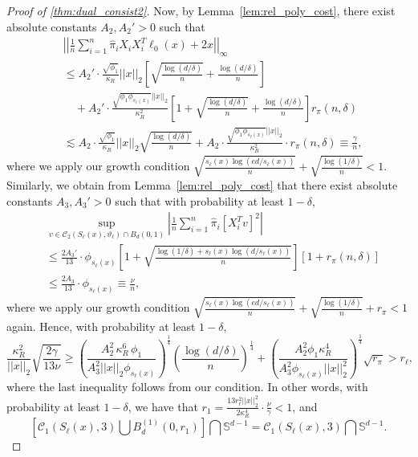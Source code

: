 \documentclass[10pt,a4paper]{amsart}
\theoremstyle{plain}
\theoremstyle{remark}
\renewcommand{\hat}{\widehat}
\newcommand{\norm}[1]{\left|\left| #1 \right|\right|}
\begin{document}
\begin{proof}[Proof of \autoref{thm:dual_consist2}]
	Now, by Lemma~\ref{lem:rel_poly_cost}, there exist absolute constants $A_2,A_2'>0$ such that 
	\begin{align*}
		&\norm{\frac{1}{n}\sum_{i=1}^n \hat{\pi}_i X_i X_i^T \ell_0(x) + 2x}_{\infty} \\
		&\leq A_2'\cdot \frac{\sqrt{\phi_1}}{\kappa_R}\norm{x}_2 \left[\sqrt{\frac{\log(d/\delta)}{n}} + \frac{\log(d/\delta)}{n} \right]\\
		&\quad + A_2'\cdot \frac{\sqrt{\phi_1 \phi_{s_{\ell}(x)}}\norm{x}_2}{\kappa_R^2} \left[1 + \sqrt{\frac{\log(d/\delta)}{n}} + \frac{\log(d/\delta)}{n}\right] r_{\pi}(n,\delta)\\
		&\lesssim A_2\cdot \frac{\sqrt{\phi_1}}{\kappa_R}\norm{x}_2\sqrt{\frac{\log(d/\delta)}{n}} + A_2\cdot \frac{\sqrt{\phi_1 \phi_{s_{\ell}(x)}}\norm{x}_2}{\kappa_R^2} \cdot r_{\pi}(n,\delta) \equiv \frac{\gamma}{n},
	\end{align*}
	where we apply our growth condition $\sqrt{\frac{s_{\ell}(x)\log(ed/s_{\ell}(x))}{n}} + \sqrt{\frac{\log(1/\delta)}{n}} < 1$. Similarly, we obtain from Lemma~\ref{lem:rel_poly_cost} that there exist absolute constants $A_3,A_3'>0$ such that with probability at least $1-\delta$,
	\begin{align*}
		&\sup_{v\in \mathcal{C}_2\left(S_{\ell}(x), \vartheta_{\ell}\right)\cap B_d(0,1)} \left|\frac{1}{n} \sum_{i=1}^n \hat{\pi}_i\left[X_i^Tv\right]^2 \right| \\
		&\leq \frac{2A_3'}{13}\cdot \phi_{s_{\ell}(x)}\left[1+ \sqrt{\frac{\log(1/\delta) + s_{\ell}(x) \log\left(d/s_{\ell}(x)\right)}{n}}\right] \left[1 + r_{\pi}(n,\delta)\right] \\
		&\leq \frac{2A_3}{13}\cdot \phi_{s_{\ell}(x)} \equiv \frac{\nu}{n},
	\end{align*}
	where we apply our growth condition $\sqrt{\frac{s_{\ell}(x)\log(ed/s_{\ell}(x))}{n}} + \sqrt{\frac{\log(1/\delta)}{n}} + r_{\pi} < 1$ again. Hence, with probability at least $1-\delta$,
	$$\frac{\kappa_R^2}{\norm{x}_2} \sqrt{\frac{2\gamma}{13\nu}} \geq \left(\frac{A_2^2 \,\kappa_R^6\, \phi_1}{A_3^2\norm{x}_2 \phi_{s_{\ell}(x)}}\right)^{\frac{1}{4}} \left(\frac{\log(d/\delta)}{n}\right)^{\frac{1}{4}} + \left(\frac{A_2^2 \phi_1 \kappa_R^4}{A_3^2 \phi_{s_{\ell}(x)} \norm{x}_2^2}\right)^{\frac{1}{4}} \sqrt{r_{\pi}} > r_{\ell},$$
	where the last inequality follows from our condition. In other words, with probability at least $1-\delta$, we have that $r_1= \frac{13 r_{\ell}^2 \norm{x}_2^2}{2 \kappa_R^4} \cdot \frac{\nu}{\gamma} < 1$, and 
	$$\left[\mathcal{C}_1\left(S_{\ell}(x), 3 \right) \bigcup B_d^{(1)}(0,r_1)\right] \bigcap \mathbb{S}^{d-1} = \mathcal{C}_1\left(S_{\ell}(x), 3 \right) \bigcap \mathbb{S}^{d-1}.$$
	

\end{proof}
\end{document}
